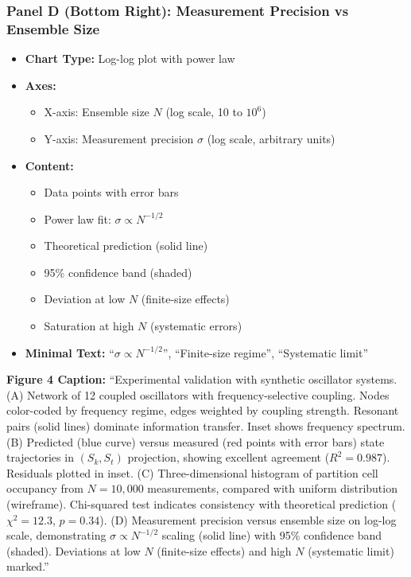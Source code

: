 \subsubsection*{Panel D (Bottom Right): Measurement Precision vs Ensemble Size}
\begin{itemize}
\item \textbf{Chart Type:} Log-log plot with power law
\item \textbf{Axes:}
  \begin{itemize}
  \item X-axis: Ensemble size $N$ (log scale, 10 to $10^6$)
  \item Y-axis: Measurement precision $\sigma$ (log scale, arbitrary units)
  \end{itemize}
\item \textbf{Content:}
  \begin{itemize}
  \item Data points with error bars
  \item Power law fit: $\sigma \propto N^{-1/2}$
  \item Theoretical prediction (solid line)
  \item 95\% confidence band (shaded)
  \item Deviation at low $N$ (finite-size effects)
  \item Saturation at high $N$ (systematic errors)
  \end{itemize}
\item \textbf{Minimal Text:} ``$\sigma \propto N^{-1/2}$'', ``Finite-size regime'', ``Systematic limit''
\end{itemize}

\textbf{Figure 4 Caption:}
``Experimental validation with synthetic oscillator systems. (A) Network of 12 coupled oscillators with frequency-selective coupling. Nodes color-coded by frequency regime, edges weighted by coupling strength. Resonant pairs (solid lines) dominate information transfer. Inset shows frequency spectrum. (B) Predicted (blue curve) versus measured (red points with error bars) state trajectories in $(S_k,S_t)$ projection, showing excellent agreement ($R^2=0.987$). Residuals plotted in inset. (C) Three-dimensional histogram of partition cell occupancy from $N=10{,}000$ measurements, compared with uniform distribution (wireframe). Chi-squared test indicates consistency with theoretical prediction ($\chi^2=12.3$, $p=0.34$). (D) Measurement precision versus ensemble size on log-log scale, demonstrating $\sigma\propto N^{-1/2}$ scaling (solid line) with 95\% confidence band (shaded). Deviations at low $N$ (finite-size effects) and high $N$ (systematic limit) marked.''

